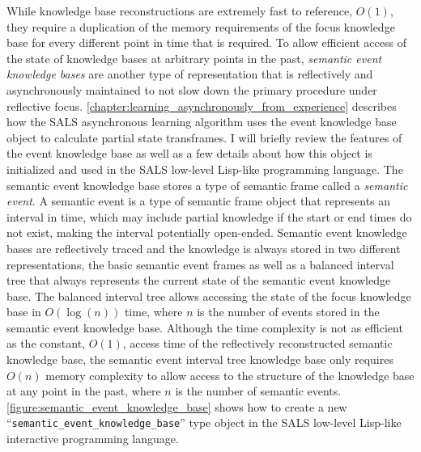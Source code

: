 While knowledge base reconstructions are extremely fast to reference,
$O(1)$, they require a duplication of the memory requirements of the
focus knowledge base for every different point in time that is
required.  To allow efficient access of the state of knowledge bases
at arbitrary points in the past, {\emph{semantic event knowledge
    bases}} are another type of representation that is reflectively
and asynchronously maintained to not slow down the primary procedure
under reflective focus.
{\mbox{\autoref{chapter:learning_asynchronously_from_experience}}}
describes how the SALS asynchronous learning algorithm uses the event
knowledge base object to calculate partial state transframes.  I will
briefly review the features of the event knowledge base as well as a
few details about how this object is initialized and used in the SALS
low-level Lisp-like programming language.  The semantic event
knowledge base stores a type of semantic frame called a
{\emph{semantic event}}.  A semantic event is a type of semantic frame
object that represents an interval in time, which may include partial
knowledge if the start or end times do not exist, making the interval
potentially open-ended.  Semantic event knowledge bases are
reflectively traced and the knowledge is always stored in two
different representations, the basic semantic event frames as well as
a balanced interval tree that always represents the current state of
the semantic event knowledge base.  The balanced interval tree allows
accessing the state of the focus knowledge base in $O(\log{(n)})$
time, where $n$ is the number of events stored in the semantic event
knowledge base.  Although the time complexity is not as efficient as
the constant, $O(1)$, access time of the reflectively reconstructed
semantic knowledge base, the semantic event interval tree knowledge
base only requires $O(n)$ memory complexity to allow access to the
structure of the knowledge base at any point in the past, where $n$ is
the number of semantic events.
{\mbox{\autoref{figure:semantic_event_knowledge_base}}} shows how to
create a new ``{\tt{semantic\_event\_knowledge\_base}}'' type object
in the SALS low-level Lisp-like interactive programming language.
